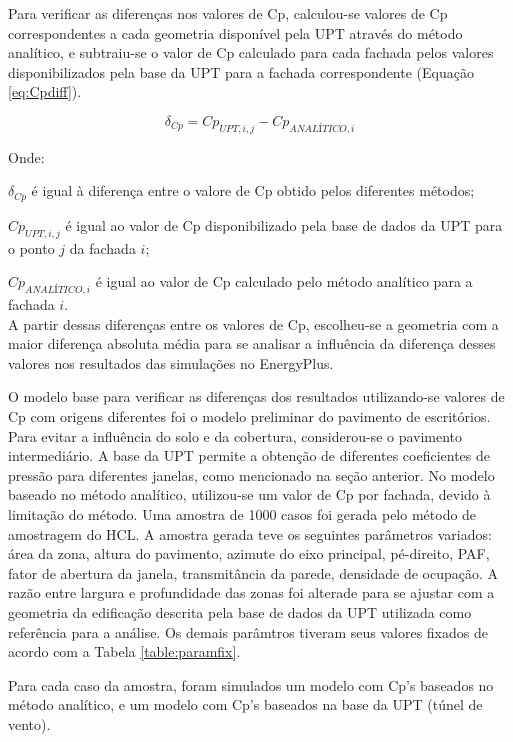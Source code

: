 \documentclass[brazil,hardcopy,openany,a5paper]{ufscthesis}
\begin{document}
		
		Para verificar as diferenças nos valores de Cp, calculou-se valores de Cp correspondentes a cada geometria disponível pela UPT através do método analítico, e subtraiu-se o valor de Cp calculado para cada fachada pelos valores disponibilizados pela base da UPT para a fachada correspondente (Equação \ref{eq:Cpdiff}).
		
		\begin{equation}
		\label{eq:Cpdiff}
		\delta_{Cp} = Cp_{UPT,i,j} - Cp_{ANALÍTICO, i}
		\end{equation}
		
		Onde:
		
		$\delta_{Cp}$ é igual à diferença entre o valore de Cp obtido pelos diferentes métodos;
		
		$Cp_{UPT,i,j}$ é igual ao valor de Cp disponibilizado pela base de dados da UPT para o ponto $j$ da fachada $i$;
		
		$Cp_{ANALÍTICO, i}$ é igual ao valor de Cp calculado pelo método analítico para a fachada $i$.
		\\
		
		A partir dessas diferenças entre os valores de Cp, escolheu-se a geometria com a maior diferença absoluta média para se analisar a influência da diferença desses valores nos resultados das simulações no EnergyPlus.
		
		O modelo base para verificar as diferenças dos resultados utilizando-se valores de Cp com origens diferentes foi o modelo preliminar do pavimento de escritórios. Para evitar a influência do solo e da cobertura, considerou-se o pavimento intermediário. A base da UPT permite a obtenção de diferentes coeficientes de pressão para diferentes janelas, como mencionado na seção anterior. No modelo baseado no método analítico, utilizou-se um valor de Cp por fachada, devido à limitação do método. Uma amostra de 1000 casos foi gerada pelo método de amostragem do HCL. A amostra gerada teve os seguintes parâmetros variados: área da zona, altura do pavimento, azimute do eixo principal, pé-direito, PAF, fator de abertura da janela, transmitância da parede, densidade de ocupação. A razão entre largura e profundidade das zonas foi alterade para se ajustar com a geometria da edificação descrita pela base de dados da UPT utilizada como referência para a análise. Os demais parâmtros tiveram seus valores fixados de acordo com a Tabela \ref{table:paramfix}.
				
		Para cada caso da amostra, foram simulados um modelo com Cp’s baseados no método analítico, e um modelo com Cp’s baseados na base da UPT (túnel de vento).
		
\end{document}
